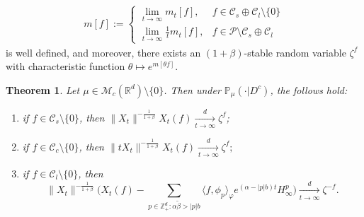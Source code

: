 \documentclass[12pt,a4paper]{amsart}
\theoremstyle{plain}
\newtheorem{thm}{Theorem}[section]
\theoremstyle{definition}
\numberwithin{equation}{section}
\begin{document}
    \begin{align} 
      \label{eq:I:R:3}
      m[f]
      := \begin{cases}
        \lim_{t\to \infty} m_t[f], & f \in \mathcal C_s \oplus \mathcal C_l \setminus \{0\}\\
        \lim_{t\to \infty} \frac{1}{t} m_t[f], & f\in \mathcal P \setminus \mathcal C_s \oplus \mathcal C_l
        \end{cases}
    \end{align}     
    is well defined, and moreover, there exists an $(1+\beta)$-stable random variable $\zeta^f$ with characteristic function $\theta \mapsto e^{m[\theta f]}$.
    \begin{thm}
      \label{thm:M}
    Let $\mu\in \mathcal M_c(\mathbb R^d)\setminus \{0\}$. 
    Then under $\mathbb{P}_{\mu}(\cdot|D^c)$, the follows hold:
\begin{enumerate}
\item
  \label{thm:M:1}
  if $f\in \mathcal C_s\setminus\{0\}$, then $\|X_t\|^{- \frac{1}{1+\beta}} X_t(f)  \xrightarrow[t\to \infty]{d} \zeta^f$;
\item
  \label{thm:M:2}
  if $f\in \mathcal C_c\setminus\{0\}$, then
  \(
    \|t X_t\|^{-\frac{1}{1+\beta}} X_t(f)
    \xrightarrow[t\to \infty]{d} 
    \zeta^f;
    \)
  \item
    \label{thm:M:3}
    if $f\in \mathcal C_l\setminus\{0\}$, then
\[
  \|X_t\|^{-\frac{1}{1+\beta}} \Big( X_t(f) - \sum_{p\in \mathbb Z^d_+:\alpha \tilde \beta>|p|b}\langle f,\phi_p\rangle_\varphi e^{(\alpha-|p|b)t}H^p_{\infty}\Big) 
    \xrightarrow[t\to \infty]{d}
    \zeta^{-f}.
\]    
\end{enumerate}
\end{thm}

\begin{comment}
Denote by $\mathcal M_c(\mathbb R^d)$ the space of all finite Borel measures of compact support on $\mathbb R^d$.
For each $p\in \mathbb{Z}_+^d$, define
\[
  H_t^p
  := e^{-(\alpha-|p|b)t}\langle\phi_p,X_t\rangle,
  \quad t\geq 0.
\]
If $\alpha\beta>|p|b(1+\beta)$, then for all $\gamma\in (0, \beta)$ and $\mu\in \mathcal M_c(\mathbb R^d)$, we will prove in Lemma \ref{lem:M:L:ML} that $(H_t^p)_{t\geq 0}$ is a $\mathbb{P}_{\mu}$-martingale bounded in $L^{1+\gamma}(\mathbb{P}_{\mu})$.
Thus the limit $H^p_{\infty}:=\lim_{t\rightarrow \infty}H_t^p$ exists $\mathbb{P}_{\mu}$-almost surely and in $L^{1+\gamma}(\mathbb{P}_{\mu})$.
\end{comment}
\end{document}
